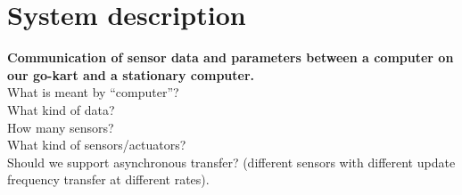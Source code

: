 
\section{System description}
\textbf{Communication of sensor data and parameters between a computer on our go-kart and a stationary computer.}\\
What is meant by “computer”?\\
What kind of data?\\
How many sensors?\\
What kind of sensors/actuators?\\
Should we support asynchronous transfer? (different sensors with different update frequency transfer at different rates).\\
